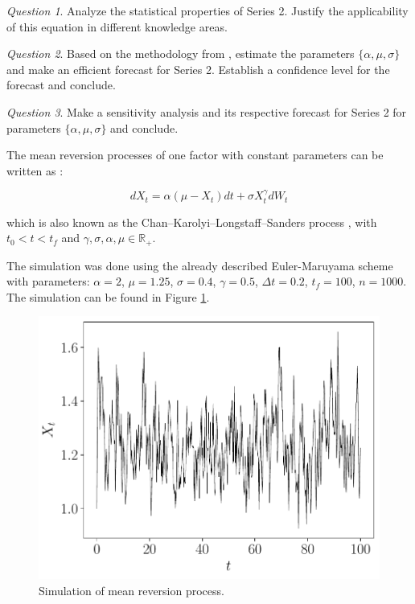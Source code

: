 \documentclass[11pt]{article}
\theoremstyle{definition}
\theoremstyle{remark}
\theoremstyle{remark}
\newtheorem{question}{Question}
\newcommand{\R}{{\mathbb{R}}}
\begin{document}
\begin{question}
  Analyze the statistical properties of Series 2. Justify the
  applicability of this equation in different knowledge areas.
\end{question}

\begin{question}
  Based on the methodology from \parencite{marin2013}, estimate the
  parameters $\{\alpha, \mu, \sigma\}$ and make an efficient forecast
  for Series 2. Establish a confidence level for the forecast and
  conclude.
\end{question}

\begin{question}
  Make a sensitivity analysis and its respective forecast for Series 2
  for parameters $\{\alpha, \mu, \sigma\}$ and conclude.
\end{question}

The mean reversion processes of one factor with constant parameters
can be written as \parencite{marin2013}:

\begin{equation*}
  dX_t = \alpha (\mu - X_t) dt + \sigma X_t^\gamma dW_t
\end{equation*}

which is also known as the Chan–Karolyi–Longstaff–Sanders process
\parencite{chan1992}, with $t_0 < t < t_f$ and
$\gamma, \sigma, \alpha, \mu \in \R_+$.

The simulation was done using the already described Euler-Maruyama scheme
with parameters: $\alpha = 2$, $\mu = 1.25$, $\sigma = 0.4$, $\gamma = 0.5$,
$\Delta t = 0.2$, $t_f = 100$, $n = 1000$. The simulation can be found in Figure
\ref{fig:series2}.

\begin{figure}[H]
  \centering
  \includegraphics[scale=.5]{ornstein_serie2.pdf}
  \caption{Simulation of mean reversion process.}
  \label{fig:series2}
\end{figure}
\end{document}
